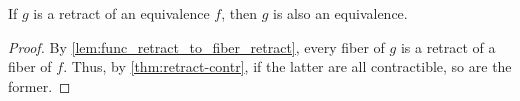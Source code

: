 %
\begin{thm}\label{thm:retract-equiv}
  If $g$ is a retract of an equivalence $f$, then $g$ is also an equivalence.
\end{thm}

\begin{proof}
  By \cref{lem:func_retract_to_fiber_retract}, every fiber of $g$ is a retract of a fiber of $f$.
  Thus, by \cref{thm:retract-contr}, if the latter are all contractible, so are the former.
\end{proof}
